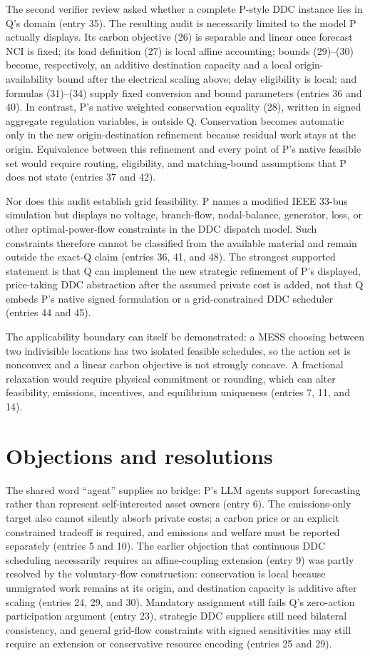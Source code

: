 \documentclass{article}
\begin{document}
The second verifier review asked whether a complete P-style DDC instance lies in Q's domain (entry 35). The resulting audit is necessarily limited to the model P actually displays. Its carbon objective (26) is separable and linear once forecast NCI is fixed; its load definition (27) is local affine accounting; bounds (29)--(30) become, respectively, an additive destination capacity and a local origin-availability bound after the electrical scaling above; delay eligibility is local; and formulas (31)--(34) supply fixed conversion and bound parameters (entries 36 and 40). In contrast, P's native weighted conservation equality (28), written in signed aggregate regulation variables, is outside Q. Conservation becomes automatic only in the new origin-destination refinement because residual work stays at the origin. Equivalence between this refinement and every point of P's native feasible set would require routing, eligibility, and matching-bound assumptions that P does not state (entries 37 and 42).

Nor does this audit establish grid feasibility. P names a modified IEEE 33-bus simulation but displays no voltage, branch-flow, nodal-balance, generator, loss, or other optimal-power-flow constraints in the DDC dispatch model. Such constraints therefore cannot be classified from the available material and remain outside the exact-Q claim (entries 36, 41, and 48). The strongest supported statement is that Q can implement the new strategic refinement of P's displayed, price-taking DDC abstraction after the assumed private cost is added, not that Q embeds P's native signed formulation or a grid-constrained DDC scheduler (entries 44 and 45).

The applicability boundary can itself be demonstrated: a MESS choosing between two indivisible locations has two isolated feasible schedules, so the action set is nonconvex and a linear carbon objective is not strongly concave. A fractional relaxation would require physical commitment or rounding, which can alter feasibility, emissions, incentives, and equilibrium uniqueness (entries 7, 11, and 14).

\section*{Objections and resolutions}
The shared word ``agent'' supplies no bridge: P's LLM agents support forecasting rather than represent self-interested asset owners (entry 6). The emissions-only target also cannot silently absorb private costs; a carbon price or an explicit constrained tradeoff is required, and emissions and welfare must be reported separately (entries 5 and 10). The earlier objection that continuous DDC scheduling necessarily requires an affine-coupling extension (entry 9) was partly resolved by the voluntary-flow construction: conservation is local because unmigrated work remains at its origin, and destination capacity is additive after scaling (entries 24, 29, and 30). Mandatory assignment still fails Q's zero-action participation argument (entry 23), strategic DDC suppliers still need bilateral consistency, and general grid-flow constraints with signed sensitivities may still require an extension or conservative resource encoding (entries 25 and 29).
\end{document}
